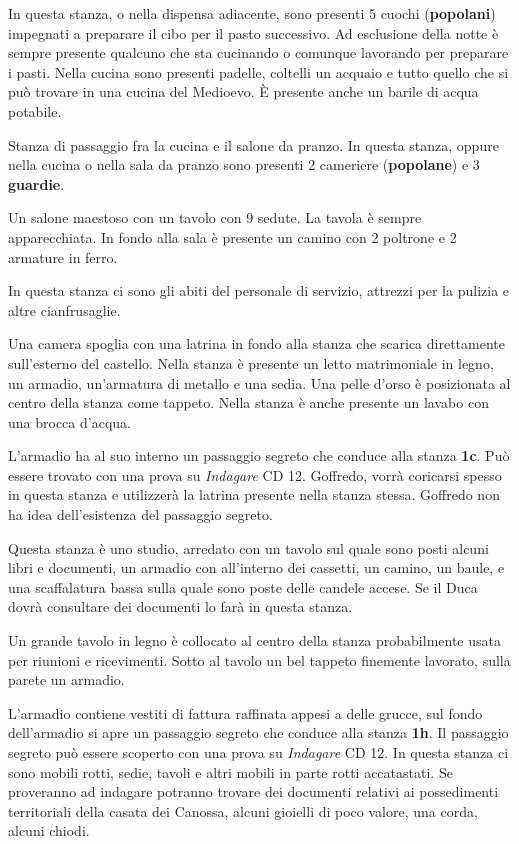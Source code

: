 \documentclass[letterpaper,twocolumn,openany,nodeprecatedcode]{dndbook}
\begin{document}
In questa stanza, o nella dispensa adiacente, sono presenti 5 cuochi (\textbf{popolani}) impegnati a preparare il cibo per il pasto successivo. Ad esclusione della notte è sempre presente qualcuno che sta cucinando o comunque lavorando per preparare i pasti. Nella cucina sono presenti padelle, coltelli un acquaio e tutto quello che si può trovare in una cucina del Medioevo. È presente anche un barile di acqua potabile.

Stanza di passaggio fra la cucina e il salone da pranzo. In questa stanza, oppure nella cucina o nella sala da pranzo sono presenti 2 cameriere (\textbf{popolane}) e 3 \textbf{guardie}.

Un salone maestoso con un tavolo con 9 sedute. La tavola è sempre apparecchiata. In fondo alla sala è presente un camino con 2 poltrone e 2 armature in ferro.

In questa stanza ci sono gli abiti del personale di servizio, attrezzi per la pulizia e altre cianfrusaglie.

\begin{DndReadAloud}
Una camera spoglia con una latrina in fondo alla stanza che scarica direttamente sull'esterno del castello. Nella stanza è presente un letto matrimoniale in legno, un armadio, un'armatura di metallo e una sedia. Una pelle d'orso è posizionata al centro della stanza come tappeto. Nella stanza è anche presente un lavabo con una brocca d'acqua.
\end{DndReadAloud}
L'armadio ha al suo interno un passaggio segreto che conduce alla stanza \textbf{1c}. Può essere trovato con una prova su \textit{Indagare} CD 12. Goffredo, vorrà coricarsi spesso in questa stanza e utilizzerà la latrina presente nella stanza stessa. Goffredo non ha idea dell'esistenza del passaggio segreto.

Questa stanza è uno studio, arredato con un tavolo sul quale sono posti alcuni libri e documenti, un armadio con all'interno dei cassetti, un camino, un baule, e una scaffalatura bassa sulla quale sono poste delle candele accese.
Se il Duca dovrà consultare dei documenti lo farà in questa stanza.

\begin{DndReadAloud}
Un grande tavolo in legno è collocato al centro della stanza probabilmente usata per riunioni e ricevimenti. Sotto al tavolo un bel tappeto finemente lavorato, sulla parete un armadio.
\end{DndReadAloud}
L'armadio contiene vestiti di fattura raffinata appesi a delle grucce, sul fondo dell'armadio si apre un passaggio segreto che conduce alla stanza \textbf{1h}. Il passaggio segreto può essere scoperto con una prova su \textit{Indagare} CD 12.
In questa stanza ci sono mobili  rotti, sedie, tavoli e altri mobili in parte rotti accatastati. Se proveranno ad indagare potranno trovare dei documenti relativi ai possedimenti territoriali della casata dei Canossa, alcuni gioielli di poco valore, una corda, alcuni chiodi.
\end{document}
